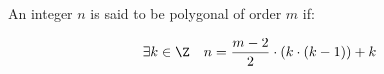 
%

\begin{definition}
    \label{def:Polygonal}
    \leanok
    An integer $n$ is said to be polygonal of order $m$ if:

    \[
        \exists k \in \Z \quad n = \frac{m-2}{2}\cdot (k \cdot (k-1)) + k
    \]
\end{definition}










